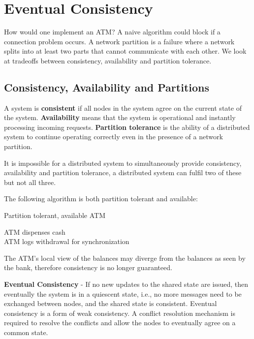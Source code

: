 \section{Eventual Consistency}

How would one implement an ATM? A naive algorithm could block if a connection problem occurs. A network partition is a failure where a network splits into at least two parts that cannot communicate with each other. We look at tradeoffs between consistency, availability and partition tolerance.


\subsection{Consistency, Availability and Partitions}

A system is \textbf{consistent} if all nodes in the system agree on the current state of the system. \textbf{Availability} means that the system is operational and instantly processing incoming requests. \textbf{Partition tolerance} is the ability of a distributed system to continue operating correctly even in the presence of a network partition. \medskip

It is impossible for a distributed system to simultaneously provide consistency, availability and partition tolerance, a distributed system can fulfil two of these but not all three. \medskip

The following algorithm is both partition tolerant and available:\medskip

\begin{algorithm}[H]
\caption{Partition tolerant, available ATM}
	ATM dispenses cash \\
	ATM logs withdrawal for synchronization
\end{algorithm}
\medskip

The ATM's local view of the balances may diverge from the balances as seen by the bank, therefore consistency is no longer guaranteed. \medskip

\textbf{Eventual Consistency} - If no new updates to the shared state are issued, then eventually the system is in a quiescent state, i.e., no more messages need to be exchanged between nodes, and the shared state is consistent. Eventual consistency is a form of weak consistency. A conflict resolution mechanism is required to resolve the conflicts and allow the nodes to eventually agree on a common state.


